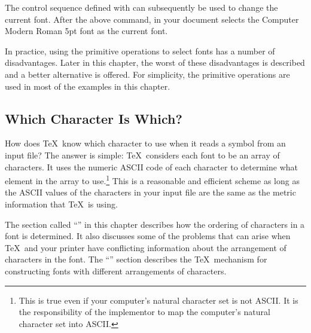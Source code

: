 The control sequence defined with  can subsequently be
used to change the current font.   After the above command,
 in your document selects the Computer
Modern Roman 5pt font as the current font.

In practice, using the primitive operations to select fonts has a
number of disadvantages.  Later in this chapter,
the worst of these disadvantages is described
and a better alternative is offered.  For simplicity, the primitive
operations are used in most of the examples in this chapter.

\subsection{Which Character Is Which?}

How does \TeX\ know which
character to 
use when it reads a symbol from an input file?  The
answer is simple: \TeX\ considers each font to be an array of
characters.  It uses the numeric 
ASCII 
code of each character to
determine what element in the array to use.\footnote{This is true even
if your computer's natural character set is not ASCII.  It is the
responsibility of the implementor to map the computer's natural
character set into ASCII.}  
This is a reasonable and efficient scheme as long as the ASCII values
of the characters in your input file are the same as the metric information
that \TeX\ is using.

The section called ``'' in this chapter
describes how the ordering of characters in a font is determined. It also 
discusses
some of the problems that can arise when \TeX\ and your printer have
conflicting information about the arrangement of characters in the font.  The
``'' section describes the \TeX\ mechanism for
constructing fonts with different arrangements of characters.


